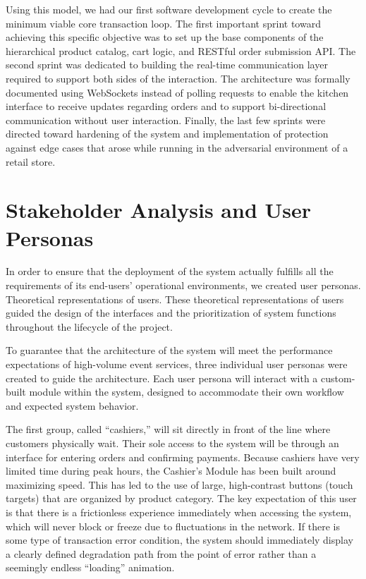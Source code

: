 Using this model, we had our first software development cycle to create the minimum viable core transaction loop. The first important sprint toward achieving this specific objective was to set up the base components of the hierarchical product catalog, cart logic, and RESTful order submission API. The second sprint was dedicated to building the real-time communication layer required to support both sides of the interaction. The architecture was formally documented using WebSockets instead of polling requests to enable the kitchen interface to receive updates regarding orders and to support bi-directional communication without user interaction. Finally, the last few sprints were directed toward hardening of the system and implementation of protection against edge cases that arose while running in the adversarial environment of a retail store.

\section{Stakeholder Analysis and User Personas}

In order to ensure that the deployment of the system actually fulfills all the requirements of its end-users' operational environments, we created user personas. Theoretical representations of users. These theoretical representations of users guided the design of the interfaces and the prioritization of system functions throughout the lifecycle of the project.

To guarantee that the architecture of the system will meet the performance expectations of high-volume event services, three individual user personas were created to guide the architecture. Each user persona will interact with a custom-built module within the system, designed to accommodate their own workflow and expected system behavior.

The first group, called ``cashiers,'' will sit directly in front of the line where customers physically wait. Their sole access to the system will be through an interface for entering orders and confirming payments. Because cashiers have very limited time during peak hours, the Cashier's Module has been built around maximizing speed. This has led to the use of large, high-contrast buttons (touch targets) that are organized by product category. The key expectation of this user is that there is a frictionless experience immediately when accessing the system, which will never block or freeze due to fluctuations in the network. If there is some type of transaction error condition, the system should immediately display a clearly defined degradation path from the point of error rather than a seemingly endless ``loading'' animation.

